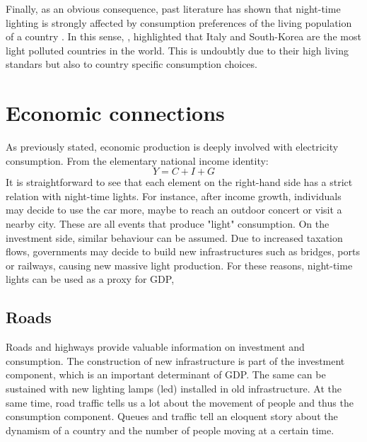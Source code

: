 Finally, as an obvious consequence, past literature has shown that night-time lighting is strongly affected by consumption preferences of the living population of a country \citep{cinzano1999mapping}. 
In this sense, \cite{falchi2016new}, highlighted that Italy and South-Korea are the most light polluted countries in the world. This is undoubtly due to their high living standars but also to country specific consumption choices.

\section{Economic connections}
As previously stated, economic production is deeply involved with electricity consumption. From the elementary
national income identity:
\begin{equation}
    Y=C+I+G
\end{equation}
It is straightforward to see that each element on the right-hand side has a strict relation with night-time lights. For instance, after income growth, individuals may decide to use the car more, maybe to reach an outdoor concert or visit a nearby city. These are all events that produce "light" consumption.
On the investment side, similar behaviour can be assumed. Due to increased taxation flows, governments may decide to build new infrastructures such as bridges, ports or railways, causing new massive light production. 
For these reasons, night-time lights can be used as a proxy for GDP, 
\subsection{Roads}
Roads and highways provide valuable information on investment and consumption. The construction of new infrastructure is part of the investment component, which is an important determinant of GDP. The same can be sustained with new lighting lamps (led) installed in old infrastructure.
At the same time, road traffic tells us a lot about the movement of people and thus the consumption component. Queues and traffic tell an eloquent story about the dynamism of a country and the number of people moving at a certain time.


